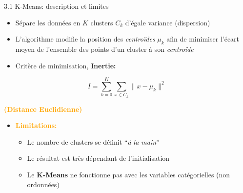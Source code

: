 \begin{frame}{3.1 K-Means: description et limites}
  \begin{itemize}
  \item Sépare les données en $K$ clusters $C_{k}$ d'égale variance (dispersion)
  \item L'algorithme modifie la position des \textit{centroïdes} $\mu_{k}$ afin de minimiser l'écart moyen de l'ensemble des points d'un cluster à son \textit{centroïde}
  \end{itemize}
  \vspace{-0.5cm}
  \begin{minipage}{0.55\textwidth}
    \begin{itemize}
    \item Critère de minimisation, \textbf{Inertie:}
    \end{itemize}
    \begin{equation*}
      I = \displaystyle\sum_{k=0}^{K}\displaystyle\sum_{x \in C_{k}}\|x-\mu_{k}\|^{2}
    \end{equation*}
    \begin{center}
      \textbf{\textcolor{orange}{(Distance Euclidienne)}}
    \end{center}
  \end{minipage}
  \hfill
  \begin{minipage}{0.4\textwidth}
  \end{minipage}
  \vspace{-1cm}
  \begin{itemize}
  \item \textbf{\textcolor{orange}{Limitations:}}
    \begin{itemize}
      \normalsize
    \item Le nombre de clusters se définit ``\textit{à la main}''
    \item Le résultat est très dépendant de l'initialisation
    \item Le \textbf{K-Means} ne fonctionne pas avec les variables catégorielles (non ordonnées)
    \end{itemize}
  \end{itemize}
\end{frame}

